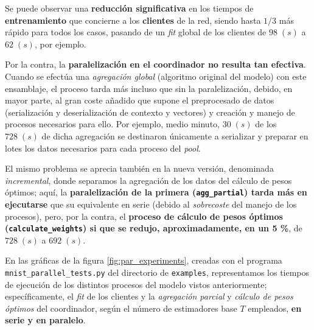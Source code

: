 \documentclass[00-Trabajo_Final.tex]{subfiles}
\begin{document}
Se puede observar una \textbf{reducción significativa} en los tiempos de \textbf{entrenamiento} que concierne a los \textbf{clientes} de la red, siendo hasta $1/3$ más rápido para todos los casos, pasando de un \textit{fit} global de los clientes de $98\;(s)$ a $62\;(s)$, por ejemplo.

Por la contra, la \textbf{paralelización en el coordinador no resulta tan efectiva}. Cuando se efectúa una \textit{agregación global} (algoritmo original del modelo) con este ensamblaje, el proceso tarda más incluso que sin la paralelización, debido, en mayor parte, al gran coste añadido que supone el preprocesado de datos (serialización y deserialización de contexto y vectores) y creación y manejo de procesos necesarios para ello. Por ejemplo, medio minuto, $30\; (s)$ de los $728\; (s)$ de dicha agregación se destinaron únicamente a serializar y preparar en lotes los datos necesarios para cada proceso del \textit{pool}.

El mismo problema se aprecia también en la nueva versión, denominada \textit{incremental}, donde separamos la agregación de los datos del cálculo de pesos óptimos; aquí, la \textbf{paralelización de la primera (\texttt{agg\_partial}) tarda más en ejecutarse} que su equivalente en serie (debido al \textit{sobrecoste} del manejo de los procesos), pero, por la contra, el \textbf{proceso de cálculo de pesos óptimos (\texttt{calculate\_weights}) si que se redujo, aproximadamente, en un 5 \%}, de $728\;(s)$ a $692\;(s)$.

\vspace{0.5em}

En las gráficas de la figura \ref{fig:par_experiments}, creadas con el programa \texttt{mnist\_parallel\_tests.py} del directorio de \verb|examples|, representamos los tiempos de ejecución de los distintos procesos del modelo vistos anteriormente; específicamente, el \textit{fit} de los clientes y la \textit{agregación parcial} y \textit{cálculo de pesos óptimos} del coordinador, según el número de estimadores base $T$ empleados, \textbf{en serie y en paralelo}.
\end{document}
